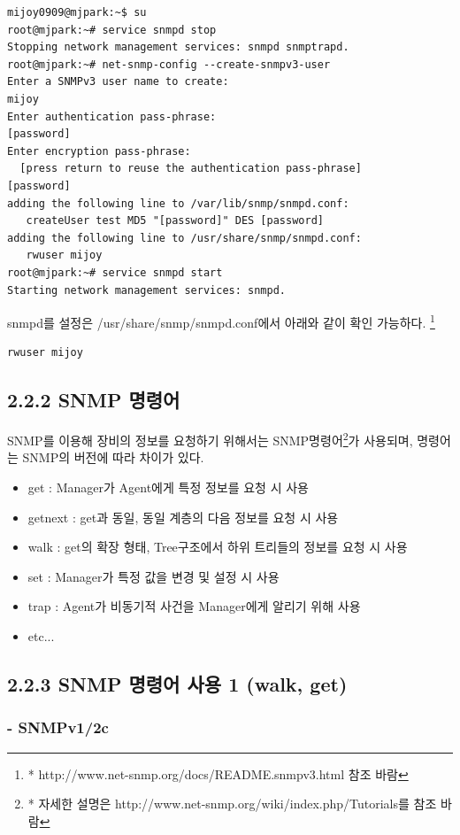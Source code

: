 \documentclass[11pt
  , a4paper
  , article
  , oneside
]{memoir}
\begin{document}
\begin{lstlisting}[style=termstyle]
mijoy0909@mjpark:~$ su                                     
root@mjpark:~# service snmpd stop
Stopping network management services: snmpd snmptrapd.
root@mjpark:~# net-snmp-config --create-snmpv3-user
Enter a SNMPv3 user name to create: 
mijoy
Enter authentication pass-phrase: 
[password]
Enter encryption pass-phrase: 
  [press return to reuse the authentication pass-phrase]
[password]
adding the following line to /var/lib/snmp/snmpd.conf:
   createUser test MD5 "[password]" DES [password]
adding the following line to /usr/share/snmp/snmpd.conf:
   rwuser mijoy 
root@mjpark:~# service snmpd start
Starting network management services: snmpd.
\end{lstlisting}

snmpd를 설정은 /usr/share/snmp/snmpd.conf에서 아래와 같이 확인 가능하다. \footnote{* http://www.net-snmp.org/docs/README.snmpv3.html 참조 바람}

\begin{lstlisting}[style=termstyle]
rwuser mijoy
\end{lstlisting}


\subsection{2.2.2 SNMP 명령어}
SNMP를 이용해 장비의 정보를 요청하기 위해서는 SNMP명령어\footnote{* 자세한 설명은 http://www.net-snmp.org/wiki/index.php/Tutorials를 참조 바람}가 사용되며, 명령어는 SNMP의 버전에 따라 차이가 있다.

\begin{itemize}
\item get : Manager가 Agent에게 특정 정보를 요청 시 사용
\item getnext : get과 동일, 동일 계층의 다음 정보를 요청 시 사용
\item walk : get의 확장 형태, Tree구조에서 하위 트리들의 정보를 요청 시 사용
\item set : Manager가 특정 값을 변경 및 설정 시 사용
\item trap : Agent가 비동기적 사건을 Manager에게 알리기 위해 사용
\item etc...
\end{itemize}

\subsection{2.2.3 SNMP 명령어 사용 1 (walk, get)}
\subsubsection{- SNMPv1/2c}
\end{document}
